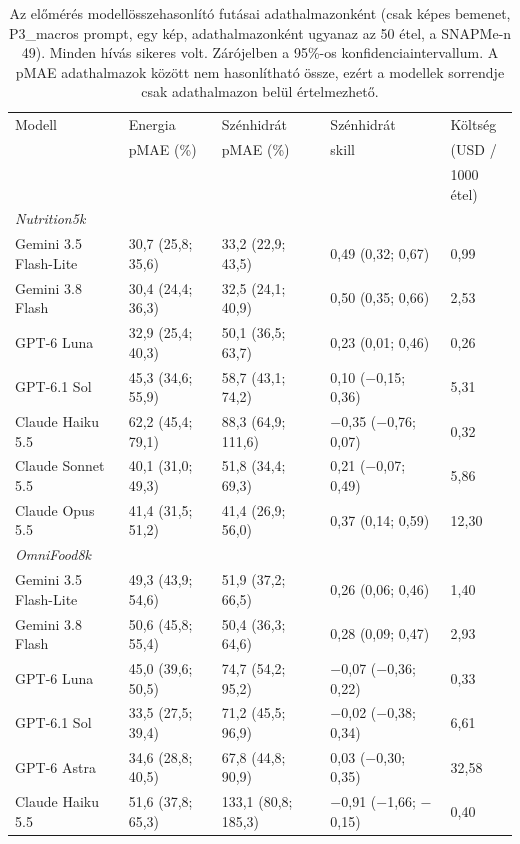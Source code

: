 \begin{table}[p]
\centering
\caption{Az előmérés modellösszehasonlító futásai adathalmazonként (csak képes bemenet, P3\_macros prompt, egy kép, 
adathalmazonként ugyanaz az 50 étel, a SNAPMe-n 49). Minden hívás sikeres volt. Zárójelben a 
95\%-os konfidenciaintervallum. A pMAE adathalmazok között nem hasonlítható össze, ezért a 
modellek sorrendje csak adathalmazon belül értelmezhető.}
\label{tab:elomeres_modellek}
{\linespread{1}\selectfont\small\setlength{\tabcolsep}{3.5pt}
\begin{tabular}{lllll}
\hline
Modell & Energia & Szénhidrát & Szénhidrát & Költség \\
 & pMAE (\%) & pMAE (\%) & skill & (USD / \\
 & & & & 1000 étel) \\
\hline
\multicolumn{5}{l}{\textit{Nutrition5k}} \\
Gemini 3.5 Flash-Lite & 30,7 (25,8; 35,6) & 33,2 (22,9; 43,5) & 0,49 (0,32; 0,67) & 0,99 \\
Gemini 3.8 Flash & 30,4 (24,4; 36,3) & 32,5 (24,1; 40,9) & 0,50 (0,35; 0,66) & 2,53 \\
GPT-6 Luna & 32,9 (25,4; 40,3) & 50,1 (36,5; 63,7) & 0,23 (0,01; 0,46) & 0,26 \\
GPT-6.1 Sol & 45,3 (34,6; 55,9) & 58,7 (43,1; 74,2) & 0,10 ($-$0,15; 0,36) & 5,31 \\
Claude Haiku 5.5 & 62,2 (45,4; 79,1) & 88,3 (64,9; 111,6) & $-$0,35 ($-$0,76; 0,07) & 0,32 \\
Claude Sonnet 5.5 & 40,1 (31,0; 49,3) & 51,8 (34,4; 69,3) & 0,21 ($-$0,07; 0,49) & 5,86 \\
Claude Opus 5.5 & 41,4 (31,5; 51,2) & 41,4 (26,9; 56,0) & 0,37 (0,14; 0,59) & 12,30 \\
\hline
\multicolumn{5}{l}{\textit{OmniFood8k}} \\
Gemini 3.5 Flash-Lite & 49,3 (43,9; 54,6) & 51,9 (37,2; 66,5) & 0,26 (0,06; 0,46) & 1,40 \\
Gemini 3.8 Flash & 50,6 (45,8; 55,4) & 50,4 (36,3; 64,6) & 0,28 (0,09; 0,47) & 2,93 \\
GPT-6 Luna & 45,0 (39,6; 50,5) & 74,7 (54,2; 95,2) & $-$0,07 ($-$0,36; 0,22) & 0,33 \\
GPT-6.1 Sol & 33,5 (27,5; 39,4) & 71,2 (45,5; 96,9) & $-$0,02 ($-$0,38; 0,34) & 6,61 \\
GPT-6 Astra & 34,6 (28,8; 40,5) & 67,8 (44,8; 90,9) & 0,03 ($-$0,30; 0,35) & 32,58 \\
Claude Haiku 5.5 & 51,6 (37,8; 65,3) & 133,1 (80,8; 185,3) & $-$0,91 ($-$1,66; $-$0,15) & 0,40 \\

\end{tabular}}
\end{table}
